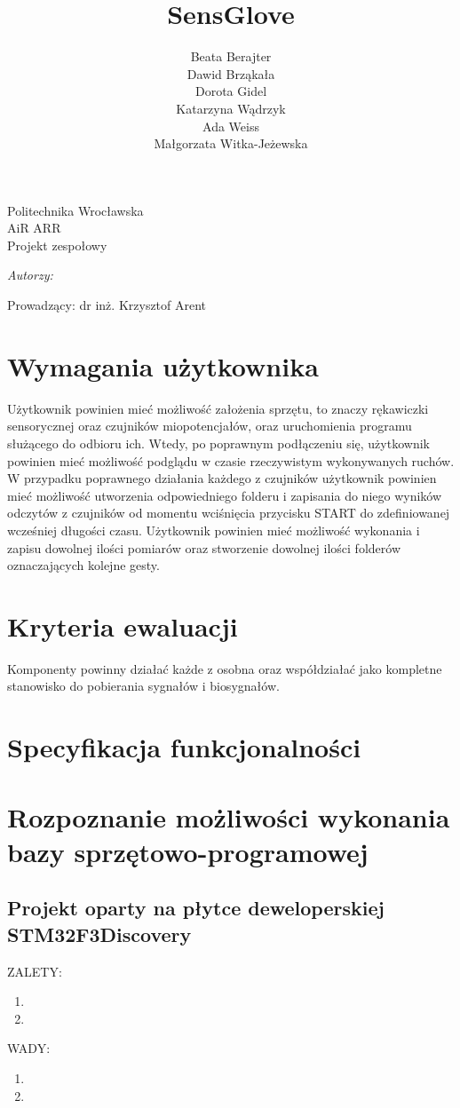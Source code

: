 \documentclass{article}
\author{Beata Berajter\\
Dawid Brząkała\\
Dorota Gidel\\
Katarzyna Wądrzyk\\
Ada Weiss\\
Małgorzata Witka-Jeżewska\\
 }
\title{SensGlove}
\makeatletter
\renewcommand{\maketitle}{\begin{titlepage}
    \vspace*{1cm}
    \begin{center}
    Politechnika Wrocławska\\
    AiR ARR\\
 Projekt zespołowy
    \end{center}
      \vspace{3cm}
    \begin{center}

     \LARGE \textsc {\@title}
         \end{center}
     \vspace{1cm}

    \begin{center}
    \textit{ Autorzy:}\\
   \textit{\@author}
     \end{center}
      \vspace{1cm}

     \begin{center}

    Prowadzący:
  dr inż. Krzysztof Arent
    \end{center}

    \vspace*{\stretch{6}}
    \begin{center}
    \@date
    \end{center}
  \end{titlepage}
}
\makeatother
\begin{document}
\maketitle
\newpage
\tableofcontents
\newpage


\section{Wymagania użytkownika}
Użytkownik powinien mieć możliwość założenia sprzętu, to znaczy rękawiczki sensorycznej oraz czujników miopotencjałów, oraz uruchomienia programu służącego do odbioru ich. Wtedy, po poprawnym podłączeniu się, użytkownik powinien mieć możliwość podglądu w czasie rzeczywistym wykonywanych ruchów. W przypadku poprawnego działania każdego z czujników użytkownik powinien mieć możliwość utworzenia odpowiedniego folderu i zapisania do niego wyników odczytów z czujników od momentu wciśnięcia przycisku START do zdefiniowanej wcześniej długości czasu. Użytkownik powinien mieć możliwość wykonania i zapisu dowolnej ilości pomiarów oraz stworzenie dowolnej ilości folderów oznaczających kolejne gesty.

\section{Kryteria ewaluacji}
Komponenty powinny działać każde z osobna oraz współdziałać jako kompletne stanowisko do pobierania sygnałów i biosygnałów.


\section{Specyfikacja funkcjonalności}
\section{Rozpoznanie możliwości wykonania bazy sprzętowo-programowej}

\subsection{Projekt oparty na płytce deweloperskiej STM32F3Discovery}
ZALETY:\\
\begin{enumerate}
    \item
    \item
\end{enumerate}
WADY:\\
\begin{enumerate}
    \item
    \item
\end{enumerate}
\end{document}
